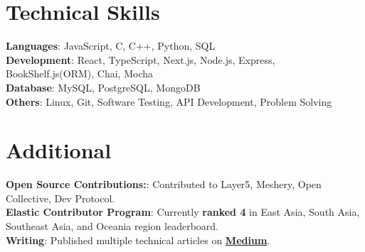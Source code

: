 \documentclass[letterpaper,11pt]{article}
\begin{document}
%
\section{Technical Skills}
 \begin{itemize}[leftmargin=0.15in, label={}]
    \small{\item{
     \textbf{Languages}{: JavaScript, C, C++, Python, SQL} \\
     \textbf{Development}{: React, TypeScript, Next.js, Node.js, Express, BookShelf.js(ORM), Chai, Mocha} \\
     \textbf{Database}{: MySQL, PostgreSQL, MongoDB} \\
     \textbf{Others}{: Linux, Git, Software Testing, API Development, Problem Solving} \\
    }}
 \end{itemize}
 \vspace{-16pt}


\section{Additional}

 \begin{itemize}[leftmargin=0.15in, label={}]
    \small{\item{
     \textbf{Open Source Contributions:}{: Contributed to Layer5, Meshery, Open Collective, Dev Protocol.} \\
     \textbf{Elastic Contributor Program}{: Currently    \textbf{ranked 4} in  East Asia, South Asia, Southeast Asia, and Oceania region leaderboard.} \\
     \textbf{Writing}{: Published multiple technical articles on \href{https://akashgp09.medium.com/}{\textbf{Medium}}.} \\
    }}
 \end{itemize}
\end{document}
